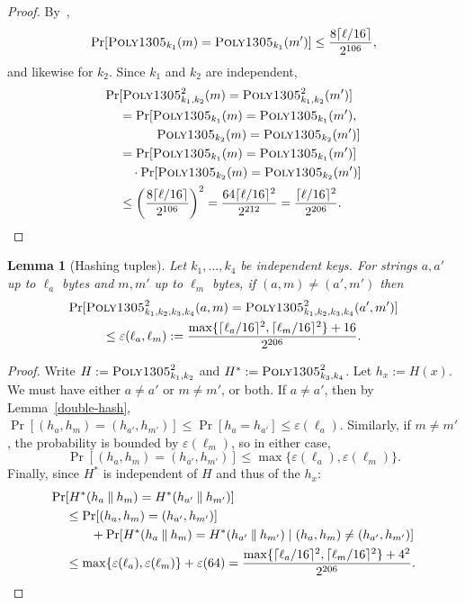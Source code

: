 \documentclass{article}
\newtheorem{lemma}{Lemma}
\def\operatorsc#1{{%
  \ifmmode\let\next=\operatorname\else\let\next=\relax\fi\next{\textsc{#1}}}}
\def\Poly#1/{\operatorsc{Poly#1}}
\newcommand{\concat}{\mathbin\|}
\newcommand{\given}{\mathrel|}
\newcommand{\collisionbound}{\varepsilon}
\begin{document}
\begin{proof}
  By~\cite[Theorem~3.3]{bernstein2005poly1305},
  \[
    \Pr[\Poly1305/_{k_1}(m) = \Poly1305/_{k_1}(m')]
    \leq \frac{8\lceil\ell/16\rceil}{2^{106}},
  \]
   and likewise for $k_2$.
  Since $k_1$ and $k_2$ are independent,
  \begin{align*}
    \Pr&[\Poly1305/^2_{k_1,k_2}(m) = \Poly1305/^2_{k_1,k_2}(m')] \\
    &= \Pr[\Poly1305/_{k_1}(m) = \Poly1305/_{k_1}(m'), \\
    &\qquad\quad\Poly1305/_{k_2}(m) = \Poly1305/_{k_2}(m')] \\
    &= \Pr[\Poly1305/_{k_1}(m) = \Poly1305/_{k_1}(m')] \\
    &\quad
       \cdot
       \Pr[\Poly1305/_{k_2}(m) = \Poly1305/_{k_2}(m')] \\
    &\leq \biggl(\frac{8\lceil\ell/16\rceil}{2^{106}}\biggr)^2
     = \frac{64\lceil\ell/16\rceil^2}{2^{212}}
     = \frac{\lceil\ell/16\rceil^2}{2^{206}}.
    \qedhere
  \end{align*}
\end{proof}

\begin{lemma}[Hashing tuples]\label{hash-tuple}
  Let $k_1, \dotsc, k_4$ be independent \Poly1305/ keys.
  For strings $a, a'$ up to $\ell_a$ bytes and $m, m'$ up to $\ell_m$
   bytes, if $(a, m) \ne (a', m')$ then
%
  \begin{multline*}
    \Pr[\Poly1305/^2_{k_1,k_2,k_3,k_4}(a, m)
        = \Poly1305/^2_{k_1,k_2,k_3,k_4}(a', m')] \\
    \leq \collisionbound(\ell_a, \ell_m)
    := \frac{\max\{\lceil\ell_a/16\rceil^2, \lceil\ell_m/16\rceil^2\}
             + 16}
            {2^{206}}.
  \end{multline*}
\end{lemma}

\begin{proof}
  Write
   $H := \Poly1305/^2_{k_1,k_2}$ and
   $H^* := \Poly1305/^2_{k_3,k_4}$.
  Let $h_x := H(x)$.
  We must have either $a \ne a'$ or $m \ne m'$, or both.
  If $a \ne a'$, then by Lemma~\ref{double-hash},
   $\Pr[(h_a, h_m) = (h_{a'}, h_{m'})]
    \leq \Pr[h_a = h_{a'}]
    \leq \collisionbound(\ell_a)$.
  Similarly, if $m \ne m'$, the probability is bounded by
   $\collisionbound(\ell_m)$,
   so in either case,
  \[
    \Pr[(h_a, h_m) = (h_{a'}, h_{m'})]
    \leq \max\{\collisionbound(\ell_a), \collisionbound(\ell_m)\}.
  \]
  Finally, since $H^*$ is independent of $H$ and thus of the $h_x$:
%
  \begin{align*}
    \Pr&[H^*(h_a \concat h_m) = H^*(h_{a'} \concat h_{m'})] \\
    &\leq \Pr[(h_a, h_m) = (h_{a'}, h_{m'})] \\
    &\qquad
          + \Pr[H^*(h_a \concat h_m) = H^*(h_{a'} \concat h_{m'})
                \given (h_a, h_m) \ne (h_{a'}, h_{m'})] \\
    &\leq \max\{\collisionbound(\ell_a), \collisionbound(\ell_m)\}
          + \collisionbound(64)
     = \frac{\max\{\lceil\ell_a/16\rceil^2, \lceil\ell_m/16\rceil^2\}
             + 4^2}
            {2^{206}}.
    \qedhere
  \end{align*}
\end{proof}

\end{document}
